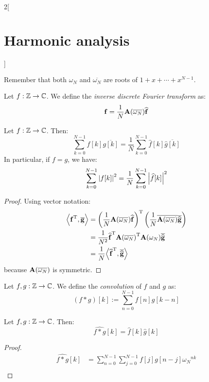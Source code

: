 \documentclass[../../../main_math.tex]{subfiles}
\begin{document}
\begin{multicols}{2}[\section{Harmonic analysis}]
\begin{lemma}
  \end{lemma}
  \begin{sproof}
    Remember that both ${\omega_N}$ and $\overline{\omega_N}$ are roots of $1+x+\cdots+x^{N-1}$.
  \end{sproof}
  \begin{definition}
    Let $f:\mathbb{Z}\rightarrow\mathbb{C}$. We define the \emph{inverse discrete Fourier transform} as:
    $$\boldsymbol{\mathrm{f}}=\frac{1}{N}\boldsymbol{\mathrm{A}}(\overline{\omega_N})\boldsymbol{\mathrm{\widehat{f}}}$$
  \end{definition}
  \begin{theorem}
    Let $f:\mathbb{Z}\rightarrow\mathbb{C}$. Then:
    $$\sum_{k=0}^{N-1}f[k]\overline{g[k]}=\frac{1}{N}\sum_{k=0}^{N-1}\widehat{f}[k]\overline{\widehat{g}[k]}$$
    In particular, if $f=g$, we have:
    $$\sum_{k=0}^{N-1}\abs{f[k]}^2=\frac{1}{N}\sum_{k=0}^{N-1}\abs{\widehat{f}[k]}^2$$
  \end{theorem}
  \begin{proof}
    Using vector notation:
    \begin{align*}
      {\left\langle{\boldsymbol{\mathrm{f}}}^{\mathrm{T}},\overline{\boldsymbol{\mathrm{g}}}\right\rangle} & ={\left(\frac{1}{N}\boldsymbol{\mathrm{A}}(\overline{\omega_N})\boldsymbol{\mathrm{\widehat{f}}}\right)}^{\mathrm{T}}\left(\frac{1}{N}\overline{\boldsymbol{\mathrm{A}}(\overline{\omega_N})}\boldsymbol{\mathrm{\overline{\widehat{g}}}}\right) \\
                                                   & =\frac{1}{N^2}{\boldsymbol{\mathrm{\widehat{f}}}}^{\mathrm{T}}{\boldsymbol{\mathrm{A}}(\overline{\omega_N})}^{\mathrm{T}}\boldsymbol{\mathrm{A}}({\omega_N})\boldsymbol{\mathrm{\overline{\widehat{g}}}}                                            \\
                                                   & =\frac{1}{N}{\left\langle{\boldsymbol{\mathrm{\widehat{f}}}}^{\mathrm{T}},\boldsymbol{\mathrm{\overline{\widehat{g}}}}\right\rangle}
    \end{align*}
    because $\boldsymbol{\mathrm{A}}(\overline{\omega_N})$ is symmetric.
  \end{proof}
  \begin{definition}
    Let $f,g:\mathbb{Z}\rightarrow\mathbb{C}$. We define the \emph{convolution} of $f$ and $g$ as:
    $$(f*g)[k]:=\sum_{n=0}^{N-1}f[n]g[k-n]$$
  \end{definition}
  \begin{lemma}
    Let $f,g:\mathbb{Z}\rightarrow\mathbb{C}$. Then:
    $$\widehat{f*g}[k]=\widehat{f}[k]\widehat{g}[k]$$
  \end{lemma}
  \begin{proof}
    \begin{align*}
      \widehat{f*g}[k] & =\sum_{n=0}^{N-1}\sum_{j=0}^{N-1}f[j]g[n-j]{\omega_N}^{nk}                    \\

\end{align*}
\end{proof}
\end{multicols}
\end{document}
